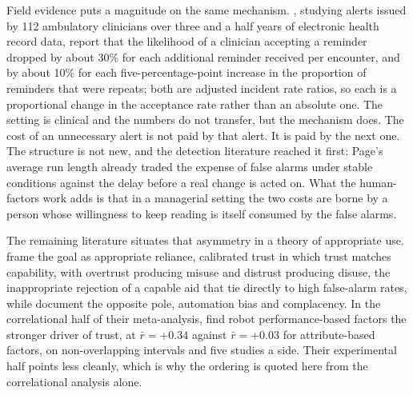 Field evidence puts a magnitude on the same mechanism.
\citet{ancker_effects_2017}, studying alerts issued by 112 ambulatory clinicians
over three and a half years of electronic health record data, report that the
likelihood of a clinician accepting a reminder dropped by about 30\% for each
additional reminder received per encounter, and by about 10\% for each
five-percentage-point increase in the proportion of reminders that were repeats;
both are adjusted incident rate ratios, so each is a proportional change in the
acceptance rate rather than an absolute one. The setting is clinical and the
numbers do not transfer, but the mechanism does. The cost of an unnecessary alert
is not paid by that alert. It is paid by the next one. The structure is not new,
and the detection literature reached it first: Page's average run length
\citep{page_continuous_1954} already traded the expense of false alarms under
stable conditions against the delay before a real change is acted on. What the
human-factors work adds is that in a managerial setting the two costs are borne
by a person whose willingness to keep reading is itself consumed by the false
alarms.

The remaining literature situates that asymmetry in a theory of appropriate use.
\citet{lee_trust_2004} frame the goal as appropriate reliance, calibrated trust
in which trust matches capability, with overtrust producing misuse and distrust
producing disuse, the inappropriate rejection of a capable aid that
\citet{parasuraman_humans_1997} tie directly to high false-alarm rates, while
\citet{parasuraman_complacency_2010} document the opposite pole, automation bias
and complacency. In the correlational half of their meta-analysis,
\citet{hancock_meta-analysis_2011} find robot performance-based factors the
stronger driver of trust, at $\bar{r} = +0.34$ against $\bar{r} = +0.03$ for
attribute-based factors, on non-overlapping intervals and five studies a side.
Their experimental half points less cleanly, which is why the ordering is quoted
here from the correlational analysis alone.

